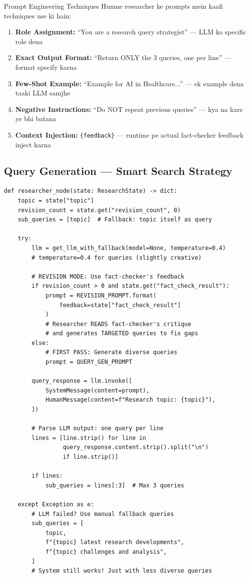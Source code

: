 \documentclass[11pt,a4paper,twoside]{report}
\begin{document}
\begin{hindibox}{Prompt Engineering Techniques}
Humne researcher ke prompts mein kaafi techniques use ki hain:
\begin{enumerate}
    \item \textbf{Role Assignment:} ``You are a research query strategist'' --- LLM ko specific role dena
    \item \textbf{Exact Output Format:} ``Return ONLY the 3 queries, one per line'' --- format specify karna
    \item \textbf{Few-Shot Example:} ``Example for AI in Healthcare...'' --- ek example dena taaki LLM samjhe
    \item \textbf{Negative Instructions:} ``Do NOT repeat previous queries'' --- kya na kare ye bhi batana
    \item \textbf{Context Injection:} \texttt{\{feedback\}} --- runtime pe actual fact-checker feedback inject karna
\end{enumerate}
\end{hindibox}

\subsection{Query Generation --- Smart Search Strategy}

\begin{lstlisting}[style=pythonstyle,caption={researcher.py --- Query Generation Logic}]
def researcher_node(state: ResearchState) -> dict:
    topic = state["topic"]
    revision_count = state.get("revision_count", 0)
    sub_queries = [topic]  # Fallback: topic itself as query

    try:
        llm = get_llm_with_fallback(model=None, temperature=0.4)
        # temperature=0.4 for queries (slightly creative)

        # REVISION MODE: Use fact-checker's feedback
        if revision_count > 0 and state.get("fact_check_result"):
            prompt = REVISION_PROMPT.format(
                feedback=state["fact_check_result"]
            )
            # Researcher READS fact-checker's critique
            # and generates TARGETED queries to fix gaps
        else:
            # FIRST PASS: Generate diverse queries
            prompt = QUERY_GEN_PROMPT

        query_response = llm.invoke([
            SystemMessage(content=prompt),
            HumanMessage(content=f"Research topic: {topic}"),
        ])

        # Parse LLM output: one query per line
        lines = [line.strip() for line in
                 query_response.content.strip().split("\n")
                 if line.strip()]

        if lines:
            sub_queries = lines[:3]  # Max 3 queries

    except Exception as e:
        # LLM failed? Use manual fallback queries
        sub_queries = [
            topic,
            f"{topic} latest research developments",
            f"{topic} challenges and analysis",
        ]
        # System still works! Just with less diverse queries
\end{lstlisting}
\end{document}

